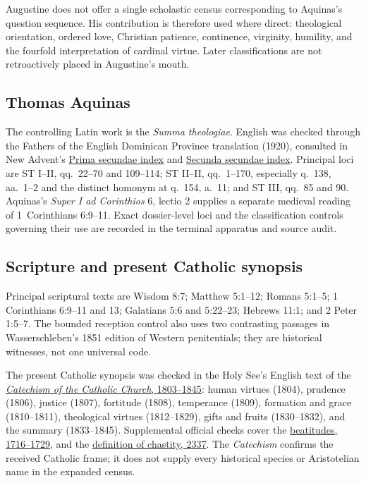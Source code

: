 Augustine does not offer a single scholastic census corresponding to Aquinas's question sequence. His contribution is therefore used where direct: theological orientation, ordered love, Christian patience, continence, virginity, humility, and the fourfold interpretation of cardinal virtue. Later classifications are not retroactively placed in Augustine's mouth.

\subsection{Thomas Aquinas}

The controlling Latin work is the \emph{Summa theologiae}. English was checked through the Fathers of the English Dominican Province translation (1920), consulted in New Advent's \href{https://www.newadvent.org/summa/2.htm}{Prima secundae index} and \href{https://www.newadvent.org/summa/3.htm}{Secunda secundae index}. Principal loci are ST I--II, qq.~22--70 and 109--114; ST II--II, qq.~1--170, especially q.~138, aa.~1--2 and the distinct homonym at q.~154, a.~11; and ST III, qq.~85 and 90. Aquinas's \emph{Super I ad Corinthios} 6, lectio 2 supplies a separate medieval reading of 1~Corinthians 6:9--11. Exact dossier-level loci and the classification controls governing their use are recorded in the terminal apparatus and source audit.

\subsection{Scripture and present Catholic synopsis}

Principal scriptural texts are Wisdom 8:7; Matthew 5:1--12; Romans 5:1--5; 1 Corinthians 6:9--11 and 13; Galatians 5:6 and 5:22--23; Hebrews 11:1; and 2 Peter 1:5--7. The bounded reception control also uses two contrasting passages in Wasserschleben's 1851 edition of Western penitentials; they are historical witnesses, not one universal code.

The present Catholic synopsis was checked in the Holy See's English text of the \href{https://www.vatican.va/content/catechism/en/part_three/section_one/chapter_one/article_7/the_virtues.html}{\emph{Catechism of the Catholic Church}, 1803--1845}: human virtues (1804), prudence (1806), justice (1807), fortitude (1808), temperance (1809), formation and grace (1810--1811), theological virtues (1812--1829), gifts and fruits (1830--1832), and the summary (1833--1845). Supplemental official checks cover the \href{https://www.vatican.va/content/catechism/en/part_three/section_one/chapter_one/article_2.html}{beatitudes, 1716--1729}, and the \href{https://www.vatican.va/content/catechism/en/part_three/section_two/chapter_two/article_6/ii_the_vocation_to_chastity.index.html}{definition of chastity, 2337}. The \emph{Catechism} confirms the received Catholic frame; it does not supply every historical species or Aristotelian name in the expanded census.
